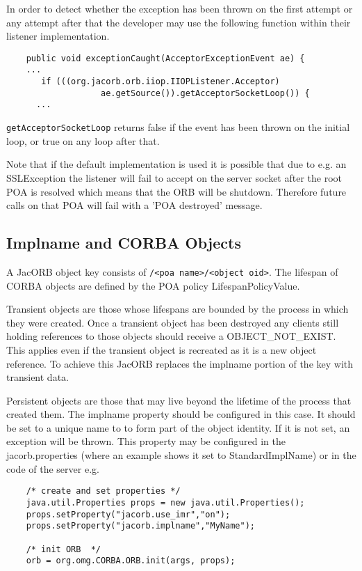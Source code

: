 In order to detect whether the exception has been thrown on the first attempt
or any attempt after that the developer may use the following function within
their listener implementation.
\begin{small}
\begin{verbatim}
    public void exceptionCaught(AcceptorExceptionEvent ae) {
    ...
       if (((org.jacorb.orb.iiop.IIOPListener.Acceptor)
                   ae.getSource()).getAcceptorSocketLoop()) {
      ...
\end{verbatim}
\end{small}
{\tt getAcceptorSocketLoop} returns false if the event has been thrown on the
initial loop, or true on any loop after that.

Note that if the default implementation is used it is possible that due to e.g.
an SSLException the listener will fail to accept on the server socket after the
root POA is resolved which means that the ORB will be shutdown. Therefore future
calls on that POA will fail with a 'POA destroyed' message.

\subsection{Implname and CORBA Objects}
\label{implname}
A JacORB object key consists of {\tt <impl name>/<poa name>/<object oid>}. The lifespan of CORBA objects are defined by the POA policy LifespanPolicyValue.

Transient objects are those whose lifespans are bounded by the process in which they were created. Once a transient object has been destroyed any clients still holding references to those objects should receive a OBJECT\_NOT\_EXIST. This applies even if the transient object is recreated as it is a new object reference. To achieve this JacORB replaces the implname portion of the key with transient data.

Persistent objects are those that may live beyond the lifetime of the process that created them. The implname property should be configured in this case. It should be set to a unique name to to form part of the object identity. If it is not set, an exception will be thrown. This property may be configured in the jacorb.properties (where an example shows it set to StandardImplName) or in the code of the server e.g.
\small{
\begin{verbatim}
    /* create and set properties */
    java.util.Properties props = new java.util.Properties();
    props.setProperty("jacorb.use_imr","on");
    props.setProperty("jacorb.implname","MyName");

    /* init ORB  */
    orb = org.omg.CORBA.ORB.init(args, props);
\end{verbatim}
}

